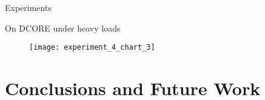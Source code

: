 \documentclass[xcolor=pdftex,dvipsnames,table]{beamer}
\begin{document}


\begin{frame}{Experiments}
  \begin{block}{On DCORE under heavy loads}
    \begin{figure}[H]
        \centering
        \texttt{[image: experiment\_4\_chart\_3]}
    \end{figure}
  \end{block}
\end{frame}



\section{Conclusions and Future Work}
\end{document}
